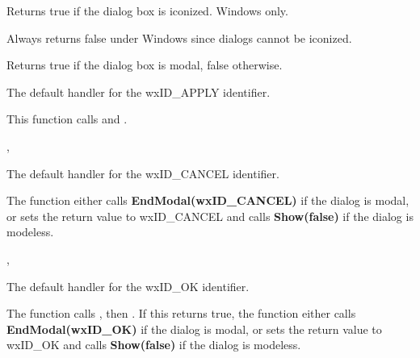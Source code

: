 
Returns true if the dialog box is iconized. Windows only.


Always returns false under Windows since dialogs cannot be iconized.


\label{wxdialogismodal}


Returns true if the dialog box is modal, false otherwise.


\label{wxdialogonapply}


The default handler for the wxID\_APPLY identifier.


This function calls  and .


, 


\label{wxdialogoncancel}


The default handler for the wxID\_CANCEL identifier.


The function either calls {\bf EndModal(wxID\_CANCEL)} if the dialog is modal, or
sets the return value to wxID\_CANCEL and calls {\bf Show(false)} if the dialog is modeless.


, 


\label{wxdialogonok}


The default handler for the wxID\_OK identifier.


The function calls
\rtfsp{}, then .
If this returns true, the function either calls {\bf EndModal(wxID\_OK)} if the dialog is modal, or
sets the return value to wxID\_OK and calls {\bf Show(false)} if the dialog is modeless.

